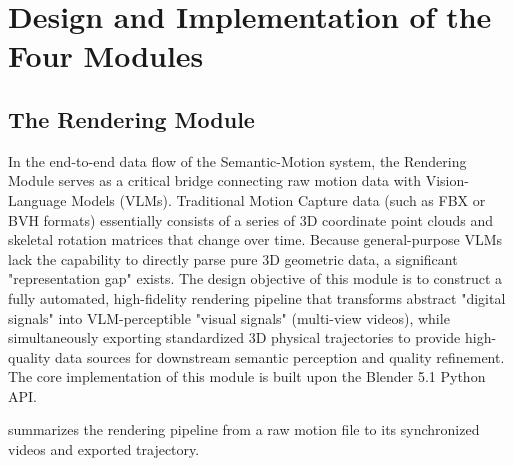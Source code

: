 \documentclass[11pt,oneside]{report}
\begin{document}
\chapter{Design and Implementation of the Four Modules}
\section{The Rendering Module}
In the end-to-end data flow of the Semantic-Motion system, the Rendering Module serves as a critical bridge connecting raw motion data with Vision-Language Models (VLMs). Traditional Motion Capture data (such as FBX or BVH formats) essentially consists of a series of 3D coordinate point clouds and skeletal rotation matrices that change over time. Because general-purpose VLMs lack the capability to directly parse pure 3D geometric data, a significant "representation gap" exists. The design objective of this module is to construct a fully automated, high-fidelity rendering pipeline that transforms abstract "digital signals" into VLM-perceptible "visual signals" (multi-view videos), while simultaneously exporting standardized 3D physical trajectories to provide high-quality data sources for downstream semantic perception and quality refinement. The core implementation of this module is built upon the Blender 5.1 Python API.

 summarizes the rendering pipeline from a raw motion file to
its synchronized videos and exported trajectory.
\end{document}
